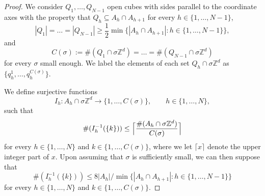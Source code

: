 \documentclass{article}
\theoremstyle{plain}
\theoremstyle{definition}
\def\ZZ{{\mathbb Z}}
\newcommand{\s}{\sigma}
\numberwithin{equation}{section}
\begin{document}
\begin{proof}
We consider $Q_1,\dots, Q_{N-1}$ open cubes with sides parallel to the coordinate axes with the property that $Q_h\subseteq A_h\cap A_{h+1}$ for every $h\in\{1,\dots, N-1\}$,
\begin{equation*}
   |Q_1|=\dots= |Q_{N-1}|\geq \frac{1}{2}\min\{|A_h\cap A_{h+1}| :  h\in\{1,\dots, N-1\}\}, 
\end{equation*}
and 
\begin{equation*}
   C(\s):= \#(Q_1\cap \s\ZZ^d)=\dots = \#(Q_{N-1}\cap \s\ZZ^d)
\end{equation*}
for every $\s$ small enough. We label the elements of each set $Q_h\cap \s\ZZ^d$ as $\{q_h^1,\dots, q_h^{C(\s)}\}$.

We define surjective functions
\begin{equation*}
   I_{h}: A_h\cap\s\mathbb Z^d \to \{1,\dots, C(\s)\}, \qquad h\in\{1,\dots,N\},
\end{equation*}
such that
\begin{equation*}
    \#(I_h^{-1}(\{k\})) \leq \Bigl\lceil\frac{\#(A_{h}\cap \s \mathbb Z^d)}{C(\s)}\Bigr\rceil
\end{equation*}
for every $h\in\{1,\dots,N\}$ and $k\in\{1,\dots, C(\s)\}$, where we let $\lceil x\rceil$ denote the upper integer part of $x$. Upon assuming that $\s$ is sufficiently small, we can then suppose that
\begin{equation}\label{stima cardinalità}
    \#(I_h^{-1}(\{k\})) \leq 8|A_h|/\min\{|A_h\cap A_{h+1}| :  h\in\{1,\dots, N-1\}\} 
\end{equation}
for every $h\in\{1,\dots,N\}$ and $k\in\{1,\dots, C(\s)\}$. 


\end{proof}
\end{document}
